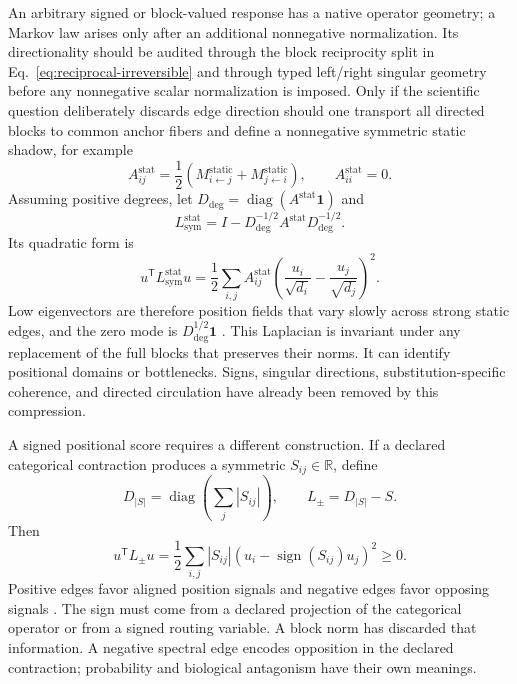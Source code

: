\documentclass[10pt]{article}
\newcommand{\R}{\mathbb R}
\newcommand{\diag}{\operatorname{diag}}
\theoremstyle{definition}
\theoremstyle{remark}
\begin{document}
An arbitrary signed or block-valued response has a native operator geometry; a Markov law arises
only after an additional nonnegative normalization.  Its directionality should be audited through the block reciprocity split
in Eq.~\ref{eq:reciprocal-irreversible} and through typed left/right singular geometry before any
nonnegative scalar normalization is imposed.  Only if the scientific question deliberately
discards edge direction should one transport all directed blocks to common anchor fibers and
define a nonnegative symmetric static shadow, for example
\begin{equation}
A_{ij}^{\mathrm{stat}}
=\frac12\left(M_{i\leftarrow j}^{\mathrm{static}}
+M_{j\leftarrow i}^{\mathrm{static}}\right),
\qquad A_{ii}^{\mathrm{stat}}=0.
\label{eq:static-adjacency}
\end{equation}
Assuming positive degrees, let
$D_{\mathrm{deg}}=\diag(A^{\mathrm{stat}}\mathbf1)$ and
\begin{equation}
L_{\mathrm{sym}}^{\mathrm{stat}}
=I-D_{\mathrm{deg}}^{-1/2}A^{\mathrm{stat}}D_{\mathrm{deg}}^{-1/2}.
\label{eq:scalar-laplacian}
\end{equation}
Its quadratic form is
\begin{equation}
u^{\mathsf T}L_{\mathrm{sym}}^{\mathrm{stat}}u
=\frac12\sum_{i,j}A_{ij}^{\mathrm{stat}}
\left(\frac{u_i}{\sqrt{d_i}}-\frac{u_j}{\sqrt{d_j}}\right)^2.
\label{eq:scalar-dirichlet}
\end{equation}
Low eigenvectors are therefore position fields that vary slowly across strong static edges, and the
zero mode is $D_{\mathrm{deg}}^{1/2}\mathbf1$ \cite{shuman2013}.  This Laplacian is invariant under
any replacement of the full blocks that preserves their norms.  It can identify positional domains
or bottlenecks.  Signs, singular directions, substitution-specific coherence, and directed
circulation have already been removed by this compression.

A signed positional score requires a different construction.  If a declared categorical
contraction produces a symmetric $S_{ij}\in\R$, define
\begin{equation}
D_{|S|}=\diag\left(\sum_j|S_{ij}|\right),
\qquad L_{\pm}=D_{|S|}-S.
\label{eq:signed-laplacian}
\end{equation}
Then
\begin{equation}
u^{\mathsf T}L_{\pm}u
=\frac12\sum_{i,j}|S_{ij}|
\left(u_i-\operatorname{sign}(S_{ij})u_j\right)^2\geq0.
\label{eq:signed-dirichlet}
\end{equation}
Positive edges favor aligned position signals and negative edges favor opposing signals
\cite{kunegis2010}.  The sign must come from a declared projection of the categorical operator or
from a signed routing variable.  A block norm has discarded that information.  A negative spectral
edge encodes opposition in the declared contraction; probability and biological antagonism have
their own meanings.
\end{document}
